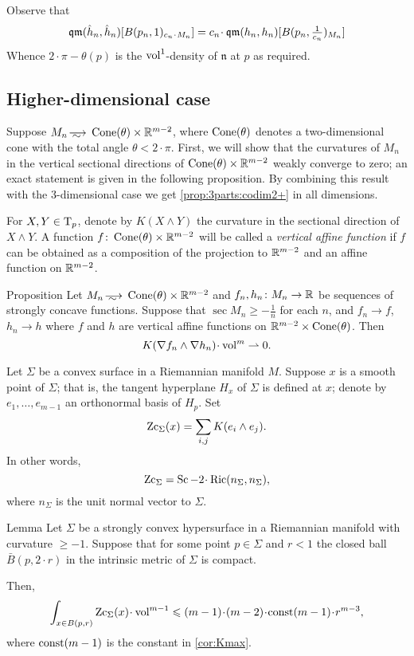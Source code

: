 Observe that 
\[\qm(\hat h_n, \hat h_n)[B(p_n,1)_{c_n\cdot M_n}]
=
c_n\cdot \qm(h_n, h_n)[B(p_n,\tfrac1{c_n})_{M_n}]\]
Whence $2\cdot \pi-\theta(p)$ is the $\operatorname{vol}^1$-density of $\mathfrak n$ at $p$ as required.
\qeds

\subsection{Higher-dimensional case}


Suppose $M_n\smooths{} \Cone(\theta)\times \RR^{m-2}$, where $\operatorname{Cone}(\theta)$ denotes a two-dimensional cone with the total angle $\theta<2\cdot\pi$.
First, we will show that the curvatures of $M_n$ in the vertical sectional directions of $\operatorname{Cone}(\theta)\times \mathbb{R}^{m-2}$ weakly converge to zero;
an exact statement is given in the following proposition.
By combining this result with the 3-dimensional case we get \ref{prop:3parts:codim2+} in all dimensions.

For $X,Y\in \mathrm{T}_p$, denote by $K(X\wedge Y)$ the curvature in the sectional direction of $X\wedge Y$.
A function $f\colon\operatorname{Cone}(\theta)\times\mathbb{R}^{m-2}$ will be called a \emph{vertical affine function} if $f$ can be obtained as a composition of the projection to $\mathbb{R}^{m-2}$ and an affine function on $\mathbb{R}^{m-2}$.

\begin{thm}{Proposition}\label{prop:vert-vert}
Let $M_n\smooths{} \Cone(\theta)\times\RR^{m-2}$
and $f_n,h_n\: M_n\zz\to \RR$ be sequences of strongly concave functions.
Suppose that $\sec M_n\ge -\tfrac1n$ for each $n$,
and $f_n\to f$, 
$h_n\to h$ where $f$ and $h$ are vertical affine functions on $\mathbb{R}^{m-2}\times \operatorname{Cone}(\theta)$.
Then 
\[K(\nabla f_n\wedge\nabla h_n)\cdot\vol^m \rightharpoonup0.\]

\end{thm}

Let $\Sigma$ be a convex surface in a Riemannian manifold $M$.
Suppose $x$ is a smooth point of $\Sigma$; that is, the tangent hyperplane $H_x$ of $\Sigma$ is defined at $x$;
denote by $e_1,\dots,e_{m-1}$ an orthonormal basis of $H_p$.
Set 
\[\operatorname{\rm Zc}_\Sigma(x)= \sum_{i,j} K(e_i\wedge e_j).\]
In other words, 
\[\Zc_\Sigma=\Sc-2\cdot\Ric(n_\Sigma,n_\Sigma),\]
where $n_\Sigma$ is the unit normal vector to $\Sigma$.

\begin{thm}{Lemma}\label{lem:nonsmooth-convex}
Let $\Sigma$ be a strongly convex hypersurface in a Riemannian manifold with curvature $\ge -1$.
Suppose that for some point $p\in \Sigma$ and $r<1$ the closed ball $\bar B(p,2\cdot r)$ in the intrinsic metric of $\Sigma$ is compact.

Then, 
\[\int_{x\in B(p,r)}\Zc_\Sigma(x)\cdot \vol^{m-1}\le (m-1)\cdot(m-2)\cdot\const(m-1)\cdot r^{m-3},\]
where $\mathrm{const}(m-1)$ is the constant in \ref{cor:Kmax}.
\end{thm}

